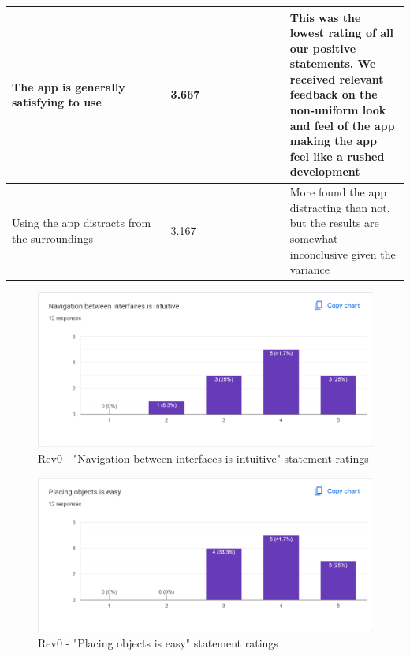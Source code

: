\documentclass{article}
\begin{document}
\begin{table}[H]
{\begin{tabular}{|p{0.4\linewidth}|p{0.3\linewidth}|p{0.7\linewidth}|}
      \hline
      The app is generally satisfying to use        & 3.667                                                & This was the lowest rating of all our positive statements. We received relevant feedback on the non-uniform look and feel of the app making the app feel like a rushed development \\
      \hline
      Using the app distracts from the surroundings & 3.167                                                & More found the app distracting than not, but the results are somewhat inconclusive given the variance                                                                              \\
      \hline
    \end{tabular}}
  \label{table:US1}
\end{table}

\begin{figure}[H]
  \caption{Rev0 - "Navigation between interfaces is intuitive" statement ratings}
  \centerline{\includegraphics[scale=0.35]{./Survey_Images/Rev0/Q1.png}}
  \label{fig:StraightForward}
\end{figure}

\begin{figure}[H]
  \caption{Rev0 - "Placing objects is easy" statement ratings}
  \centerline{\includegraphics[scale=0.35]{./Survey_Images/Rev0/Q2.png}}
  \label{fig:Navigation}
\end{figure}
\end{document}
